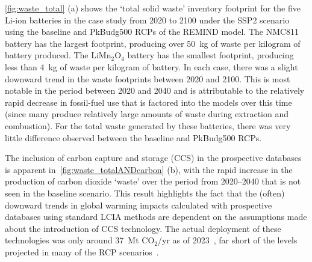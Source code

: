 \autoref{fig:waste_total} (a) shows the `total solid waste' inventory footprint for the five Li-ion batteries in the case study from 2020 to 2100 under the SSP2 scenario using the baseline and PkBudg500 RCPs of the REMIND model. The NMC811 battery has the largest footprint, producing over 50~kg of waste per kilogram of battery produced. The  LiMn\(_2\)O\(_4\) battery has the smallest footprint, producing less than 4~kg of waste per kilogram of battery. In each case, there was a slight downward trend in the waste footprints between 2020 and 2100. This is most notable in the period between 2020 and 2040 and is attributable to the relatively rapid decrease in fossil-fuel use that is factored into the models over this time (since many produce relatively large amounts of waste during extraction and combustion). For the total waste generated by these batteries, there was very little difference observed between the baseline and PkBudg500 RCPs.

The inclusion of carbon capture and storage (CCS) in the prospective databases is apparent in~\autoref{fig:waste_totalANDcarbon} (b), with the rapid increase in the production of carbon dioxide `waste' over the period from 2020--2040 that is not seen in the baseline scenario. This result highlights the fact that the (often) downward trends in global warming impacts calculated with prospective databases using standard LCIA methods are dependent on the assumptions made about the introduction of CCS technology. The actual deployment of these technologies was only around 37~Mt CO$_2$/yr as of 2023~\citep{dziejarski2023ccs}, far short of the levels projected in many of the RCP scenarios~\citep{sacchi2023premisedocs}.

